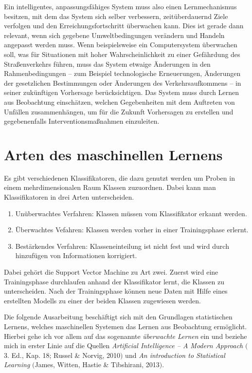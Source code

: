 Ein intelligentes, anpassungsfähiges System muss also einen Lernmechanismus besitzen,
mit dem das System sich selber verbessern, zeitüberdauernd Ziele verfolgen und den
Erreichungsfortschritt überwachen kann. Dies ist gerade dann relevant, wenn sich
gegebene Umweltbedingungen verändern und Handeln angepasst werden muss. Wenn
beispielsweise ein Computersystem überwachen soll, was für Situationen mit hoher
Wahrscheinlichkeit zu einer Gefährdung des Straßenverkehrs führen, muss das System
etwaige Änderungen in den Rahmenbedingungen -- zum Beispiel technologische
Erneuerungen, Änderungen der gesetzlichen Bestimmungen oder Änderungen des
Verkehrsaufkommens -- in seiner zukünftigen Vorhersage berücksichtigen. Das System
muss durch Lernen aus Beobachtung einschätzen, welchen Gegebenheiten mit dem
Auftreten von Unfällen zusammenhängen, um für die Zukunft Vorhersagen zu erstellen
und gegebenenfalls Interventionsmaßnahmen einzuleiten.

\section{Arten des maschinellen Lernens}
Es gibt verschiedenen Klassifikatoren, die dazu genutzt werden um Proben in einem mehrdimensionalen Raum Klassen zuzuordnen.
Dabei kann man Klassifikatoren in drei Arten unterscheiden.
\begin{enumerate}
\item Unüberwachtes Verfahren: Klassen müssen vom Klassifikator erkannt werden.
\item Überwachtes Vefahren: Klassen werden vorher in einer Trainingsphase erlernt.
\item Bestärkendes Verfahren: Klasseneinteilung ist nicht fest und wird durch hinzufügen von Informationen korrigiert.
\end{enumerate}
Dabei gehört die Support Vector Machine zu Art zwei. Zuerst wird eine Trainingsphase durchlaufen anhand der Klassifikator lernt, die Klassen zu unterscheiden. Nach der Trainingsphase können neue Daten mit Hilfe eines erstellten Modells zu einer der beiden Klassen zugewiesen werden.

Die folgende Ausarbeitung beschäftigt sich mit den Grundlagen statistischen Lernens,
welches maschinellen Systemen das Lernen aus Beobachtung ermöglicht. Hierbei gehe ich
vor allem auf das sogenannte \emph{überwachte Lernen} ein und beziehe mich in erster
Linie auf die Quellen \emph{Artificial Intelligence -- A Modern Approach} $($3. Ed.,
Kap. 18; Russel \& Norvig, 2010$)$ und \emph{An introduction to Statistical
  Learning} $($James, Witten, Hastie \& Tibshirani, 2013$)$.

